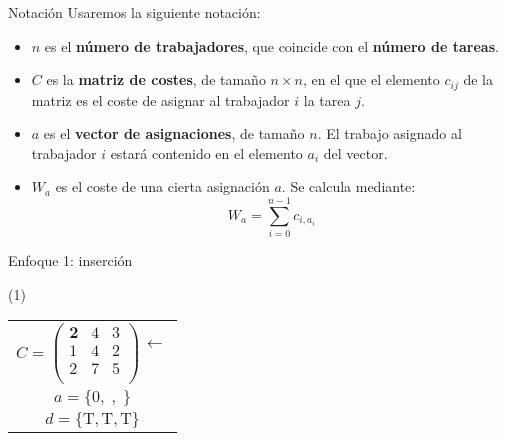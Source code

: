 \documentclass[10pt, xcolor=table]{beamer}
\begin{document}
\begin{frame}{Notación}
Usaremos la siguiente notación:
\begin{itemize}
	\item $n$ es el \textbf{número de trabajadores}, que coincide con el \textbf{número de tareas}.
	\item $C$ es la \textbf{matriz de costes}, de tamaño $n\times n$, en el que el elemento $c_{ij}$ de la matriz es el coste de asignar al trabajador $i$ la tarea $j$.
	\item $a$ es el \textbf{vector de asignaciones}, de tamaño $n$. El trabajo asignado al trabajador $i$ estará contenido en el elemento $a_i$ del vector.
	\item $W_a$ es el coste de una cierta asignación $a$. Se calcula mediante:
	$$ W_a = \sum_{i=0}^{n-1} c_{i,a_i}$$
\end{itemize}
\end{frame}

\begin{frame}{Enfoque 1: inserción}
\begin{center}
	(1)
\end{center}
\begin{table}[h]
\centering
\begin{tabular}{c}
$C = \left(\begin{matrix}\textbf{2}&4&3\\1&4&2\\2&7&5\\\end{matrix}\right)\begin{matrix}\leftarrow\\\\\\\end{matrix}$\\
$a=\{0,\;,\;\}$\\
$d=\{\text{T},\text{T},\text{T}\}$\\
\end{tabular}
\end{table}
\end{frame}
\end{document}
